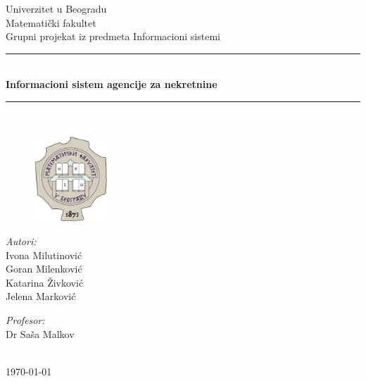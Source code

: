 \documentclass[20pt]{article}
\begin{document}
\begin{titlepage}

\newcommand{\HRule}{\rule{\linewidth}{0.5mm}}
\center
\textup{\Large Univerzitet u Beogradu\\Matemati\v{c}ki fakultet}\\[1.5cm]
\textup{\Large Grupni projekat iz predmeta Informacioni sistemi}\\[0.4cm]

\HRule \\[0.4cm]
{ \huge \bfseries Informacioni sistem agencije za nekretnine}\\[0.4cm]
\HRule \\[1.1cm]

\begin{figure}[h]
		\centering
		\includegraphics[width=0.25\textwidth,height=0.23\textheight]{Pictures/logo-fakulteta}
	\end{figure}
\vspace{4.2cm}

\begin{minipage}{0.4\textwidth}
\begin{flushleft}
\Large
\emph{Autori:}\\
Ivona Milutinovi\' c\\
Goran Milenkovi\' c\\
Katarina \v Zivkovi\' c\\
Jelena Markovi\' c

\end{flushleft}
\end{minipage}
\hfill
\begin{minipage}{0.4\textwidth}
\begin{flushright}
\Large
\emph{Profesor:} \\
Dr Sa\v sa Malkov\\
\end{flushright}
\end{minipage}\\[1.8cm]


{\Large \today}\\[1cm]
\vfill

\end{titlepage}
\end{document}

